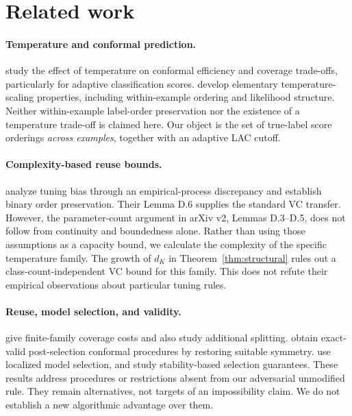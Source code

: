 \documentclass[10pt]{article}
\theoremstyle{definition}\newtheorem{definition}[theorem]{Definition}
\theoremstyle{remark}\newtheorem{remark}[theorem]{Remark}
\newcommand{\1}{\mathbf 1}
\begin{document}
\section{Related work}\label{sec:related}
\paragraph{Temperature and conformal prediction.}
\citet{dabah2025} study the effect of temperature on conformal efficiency and coverage trade-offs, particularly for adaptive classification scores. \citet{mattei2026} develop elementary temperature-scaling properties, including within-example ordering and likelihood structure. Neither within-example label-order preservation nor the existence of a temperature trade-off is claimed here. Our object is the set of true-label score orderings \emph{across examples}, together with an adaptive LAC cutoff.

\paragraph{Complexity-based reuse bounds.}
\citet{zeng2025} analyze tuning bias through an empirical-process discrepancy and establish binary order preservation. Their Lemma D.6 supplies the standard VC transfer. However, the parameter-count argument in arXiv v2, Lemmas D.3--D.5, does not follow from continuity and boundedness alone. Rather than using those assumptions as a capacity bound, we calculate the complexity of the specific temperature family. The growth of $d_K$ in Theorem~\ref{thm:structural} rules out a class-count-independent VC bound for this family. This does not refute their empirical observations about particular tuning rules.

\paragraph{Reuse, model selection, and validity.}
\citet[Theorem 1]{yang2024} give finite-family coverage costs and also study additional splitting. \citet[Theorems 3.1 and 3.3]{liang2026} obtain exact-valid post-selection conformal procedures by restoring suitable symmetry. \citet{wang2026} use localized model selection, and \citet{hegazy2025} study stability-based selection guarantees. These results address procedures or restrictions absent from our adversarial unmodified rule. They remain alternatives, not targets of an impossibility claim. We do not establish a new algorithmic advantage over them.
\end{document}
